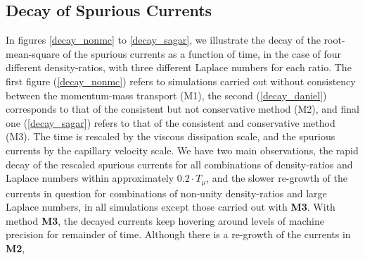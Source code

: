 \subsection*{Decay of Spurious Currents}

In figures \ref{decay_nonmc} to \ref{decay_sagar}, we illustrate the decay of the root-mean-square of the spurious currents as a function of time, in the case of four different density-ratios, with three different Laplace numbers for each ratio. The first figure (\ref{decay_nonmc}) refers to simulations carried out without consistency between the momentum-mass transport (M1), the second (\ref{decay_daniel}) corresponds to that of the consistent but not conservative method (M2), and final one (\ref{decay_sagar}) refers to that of the consistent and conservative method (M3). The time is rescaled by the viscous dissipation scale, and the spurious currents by the capillary velocity scale. We have two main observations, the rapid decay of the rescaled spurious currents for all combinations of density-ratios and Laplace numbers within approximately $0.2 \cdot T_{\mu}$, and the slower re-growth of the currents in question for combinations of non-unity density-ratios and large Laplace numbers, in all simulations except those carried out with \textbf{M3}. With method \textbf{M3}, the decayed currents keep hovering around levels of machine precision for remainder of time. Although there is a re-growth of the currents in \textbf{M2},


